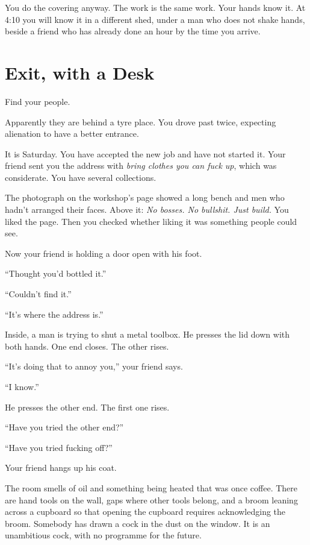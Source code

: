 \documentclass[11pt,oneside]{book}
\begin{document}
You do the covering anyway. The work is the same work. Your hands know it. At 4:10 you will know it in a different shed, under a man who does not shake hands, beside a friend who has already done an hour by the time you arrive.

\chapter*{Exit, with a Desk}

Find your people.

Apparently they are behind a tyre place. You drove past twice, expecting alienation to have a better entrance.

It is Saturday. You have accepted the new job and have not started it. Your friend sent you the address with \emph{bring clothes you can fuck up}, which was considerate. You have several collections.

The photograph on the workshop's page showed a long bench and men who hadn't arranged their faces. Above it: \emph{No bosses. No bullshit. Just build.} You liked the page. Then you checked whether liking it was something people could see.

Now your friend is holding a door open with his foot.

``Thought you'd bottled it.''

``Couldn't find it.''

``It's where the address is.''

Inside, a man is trying to shut a metal toolbox. He presses the lid down with both hands. One end closes. The other rises.

``It's doing that to annoy you,'' your friend says.

``I know.''

He presses the other end. The first one rises.

``Have you tried the other end?''

``Have you tried fucking off?''

Your friend hangs up his coat.

The room smells of oil and something being heated that was once coffee. There are hand tools on the wall, gaps where other tools belong, and a broom leaning across a cupboard so that opening the cupboard requires acknowledging the broom. Somebody has drawn a cock in the dust on the window. It is an unambitious cock, with no programme for the future.
\end{document}
